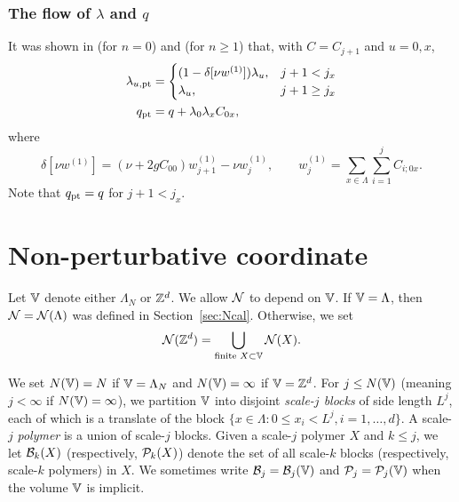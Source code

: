 \subsubsection{The flow of \texorpdfstring{$\lambda$ and $q$}{lambda and q}}

It was shown in \cite[\eqref{pt-e:lambdapt2}--\eqref{pt-e:qpt2}]{BBS-rg-pt} (for $n = 0$)
and \cite[Proposition~\ref{phi4-prop:pt}]{ST-phi4} (for $n \ge 1$) that,
with $C = C_{j+1}$ and $u = 0, x$,
\begin{align}
\label{e:lampt}
\lambda_{u,{\rm pt}}
	&=
\begin{cases}
(1 - \delta[\nu w^{(1)}]) \lambda_u,
	& j + 1 < j_x \\
\lambda_u,
	& j + 1 \ge j_x
\end{cases}
	\\
\label{e:qpt}
q_{\rm pt}
	&=
q + \lambda_0 \lambda_x C_{0x},
\end{align}
where
\begin{equation}
\label{e:deltanuw1}
\delta[\nu w^{(1)}] = (\nu + 2 g C_{00}) w^{(1)}_{j+1} - \nu w^{(1)}_j,
	\qquad
w^{(1)}_j = \sum_{x\in\Lambda} \sum_{i=1}^j C_{i;0x}.
\end{equation}
Note that $q_{\rm pt} = q$ for $j + 1 < j_x$.


\section{Non-perturbative coordinate}
\label{sec:rgcoord}

Let $\mathbb{V}$ denote either $\Lambda_N$ or ${ {{\mathbb Z}}^d }$. We allow $\mathcal{N}$ to depend on
$\mathbb{V}$. If $\mathbb{V} = \Lambda$, then $\mathcal{N} = \mathcal{N}(\Lambda)$ was defined in
Section~\ref{sec:Ncal}. Otherwise, we set
\begin{equation}
\mathcal{N}({ {{\mathbb Z}}^d }) = \bigcup_{\text{finite } X \subset \mathbb{V}} \mathcal{N}(X).
\end{equation}

We set $N(\mathbb{V}) = N$ if
$\mathbb{V} = \Lambda_N$ and $N(\mathbb{V}) = \infty$ if $\mathbb{V} = { {{\mathbb Z}}^d }$.
For $j \le N(\mathbb{V})$ (meaning $j < \infty$ if $N(\mathbb{V}) = \infty$), we partition
$\mathbb{V}$ into disjoint
\emph{scale-$j$ blocks} of side length $L^j$, each of which is a translate of
the block $\{ x \in \Lambda : 0 \le x_i < L^j, i = 1, \ldots, d\}$.
A scale-$j$ \emph{polymer} is a union of scale-$j$ blocks.
Given a scale-$j$ polymer $X$ and $k \le j$, we let $\mathcal{B}_k(X)$
(respectively, $\mathcal{P}_k(X)$)
denote the set of all scale-$k$ blocks (respectively, scale-$k$ polymers) in $X$.
We sometimes write $\mathcal{B}_j = \mathcal{B}_j(\mathbb{V})$ and $\mathcal{P}_j = \mathcal{P}_j(\mathbb{V})$
when the volume $\mathbb{V}$ is implicit.

